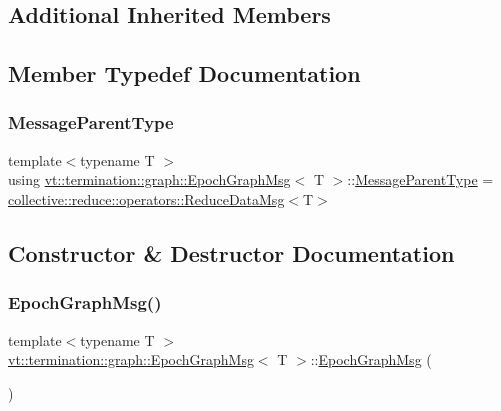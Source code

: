 \subsection*{Additional Inherited Members}


\subsection{Member Typedef Documentation}
\mbox{\label{structvt_1_1termination_1_1graph_1_1_epoch_graph_msg_a0659cb5d784ca54bb1d360ccf2293493}} 
\subsubsection{\texorpdfstring{Message\+Parent\+Type}{MessageParentType}}
{\footnotesize\ttfamily template$<$typename T $>$ \\
using \hyperlink{structvt_1_1termination_1_1graph_1_1_epoch_graph_msg}{vt\+::termination\+::graph\+::\+Epoch\+Graph\+Msg}$<$ T $>$\+::\hyperlink{structvt_1_1termination_1_1graph_1_1_epoch_graph_msg_a0659cb5d784ca54bb1d360ccf2293493}{Message\+Parent\+Type} =  \hyperlink{structvt_1_1collective_1_1reduce_1_1operators_1_1_reduce_data_msg}{collective\+::reduce\+::operators\+::\+Reduce\+Data\+Msg}$<$T$>$}



\subsection{Constructor \& Destructor Documentation}
\mbox{\label{structvt_1_1termination_1_1graph_1_1_epoch_graph_msg_a7dd7c3313549d4d61f614bc1ec38a13b}} 
\subsubsection{\texorpdfstring{Epoch\+Graph\+Msg()}{EpochGraphMsg()}\hspace{0.1cm}{\footnotesize\ttfamily [1/2]}}
{\footnotesize\ttfamily template$<$typename T $>$ \\
\hyperlink{structvt_1_1termination_1_1graph_1_1_epoch_graph_msg}{vt\+::termination\+::graph\+::\+Epoch\+Graph\+Msg}$<$ T $>$\+::\hyperlink{structvt_1_1termination_1_1graph_1_1_epoch_graph_msg}{Epoch\+Graph\+Msg} (\begin{DoxyParamCaption}{ }\end{DoxyParamCaption})\hspace{0.3cm}{\ttfamily [default]}}

